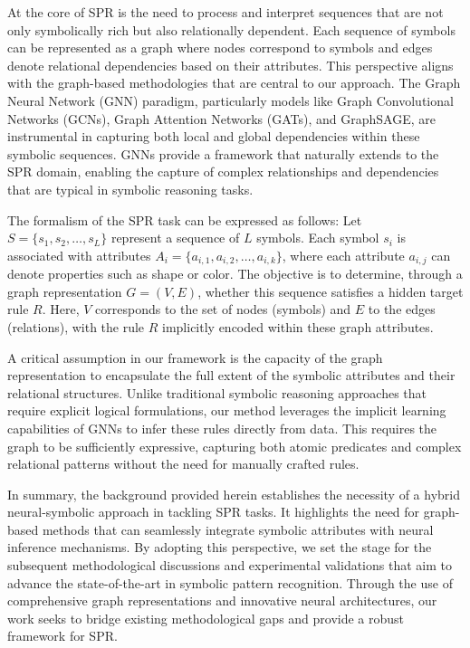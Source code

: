 \documentclass{article}
\begin{document}
At the core of SPR is the need to process and interpret sequences that are not only symbolically rich but also relationally dependent. Each sequence of symbols can be represented as a graph where nodes correspond to symbols and edges denote relational dependencies based on their attributes. This perspective aligns with the graph-based methodologies that are central to our approach. The Graph Neural Network (GNN) paradigm, particularly models like Graph Convolutional Networks (GCNs), Graph Attention Networks (GATs), and GraphSAGE, are instrumental in capturing both local and global dependencies within these symbolic sequences. GNNs provide a framework that naturally extends to the SPR domain, enabling the capture of complex relationships and dependencies that are typical in symbolic reasoning tasks.

The formalism of the SPR task can be expressed as follows: Let \(S = \{s_1, s_2, \ldots, s_L\}\) represent a sequence of \(L\) symbols. Each symbol \(s_i\) is associated with attributes \(A_i = \{a_{i,1}, a_{i,2}, \ldots, a_{i,k}\}\), where each attribute \(a_{i,j}\) can denote properties such as shape or color. The objective is to determine, through a graph representation \(G = (V, E)\), whether this sequence satisfies a hidden target rule \(R\). Here, \(V\) corresponds to the set of nodes (symbols) and \(E\) to the edges (relations), with the rule \(R\) implicitly encoded within these graph attributes.

A critical assumption in our framework is the capacity of the graph representation to encapsulate the full extent of the symbolic attributes and their relational structures. Unlike traditional symbolic reasoning approaches that require explicit logical formulations, our method leverages the implicit learning capabilities of GNNs to infer these rules directly from data. This requires the graph to be sufficiently expressive, capturing both atomic predicates and complex relational patterns without the need for manually crafted rules.

In summary, the background provided herein establishes the necessity of a hybrid neural-symbolic approach in tackling SPR tasks. It highlights the need for graph-based methods that can seamlessly integrate symbolic attributes with neural inference mechanisms. By adopting this perspective, we set the stage for the subsequent methodological discussions and experimental validations that aim to advance the state-of-the-art in symbolic pattern recognition. Through the use of comprehensive graph representations and innovative neural architectures, our work seeks to bridge existing methodological gaps and provide a robust framework for SPR.
\end{document}
